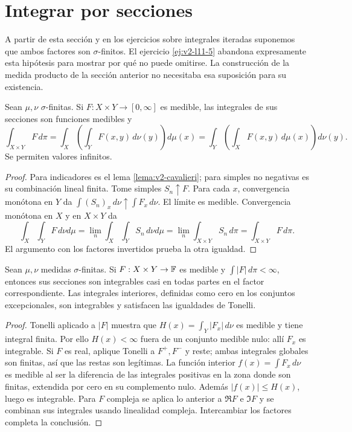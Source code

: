 \section{Integrar por secciones}
A partir de esta sección y en los ejercicios sobre integrales iteradas suponemos que ambos factores son $\sigma$-finitos. El ejercicio \ref{ej:v2-l11-5} abandona expresamente esta hipótesis para mostrar por qué no puede omitirse. La construcción de la medida producto de la sección anterior no necesitaba esa suposición para su existencia.
\begin{teorema}[Tonelli]\label{teo:v2-tonelli}
Sean $\mu,\nu$ $\sigma$-finitas. Si $F:X\times Y\to[0,\infty]$ es medible, las integrales de sus secciones son funciones medibles y
\[\int_{X\times Y}F\,d\pi=\int_X\left(\int_YF(x,y)\,d\nu(y)\right)d\mu(x)
=\int_Y\left(\int_XF(x,y)\,d\mu(x)\right)d\nu(y).\]
Se permiten valores infinitos.
\end{teorema}
\begin{proof}
Para indicadores es el lema \ref{lema:v2-cavalieri}; para simples no negativas es su combinación lineal finita. Tome simples $S_n\uparrow F$. Para cada $x$, convergencia monótona en $Y$ da $\int(S_n)_x\,d\nu\uparrow\int F_x\,d\nu$. El límite es medible. Convergencia monótona en $X$ y en $X\times Y$ da
\[\int_X\int_YF\,d\nu d\mu=\lim_n\int_X\int_YS_n\,d\nu d\mu
=\lim_n\int_{X\times Y}S_n\,d\pi=\int_{X\times Y}F\,d\pi.\]
El argumento con los factores invertidos prueba la otra igualdad.
\end{proof}
\begin{teorema}\label{teo:v2-fubini}
Sean $\mu,\nu$ medidas $\sigma$-finitas. Si $F:X\times Y\to\mathbb F$ es medible y $\int|F|\,d\pi<\infty$, entonces sus secciones son integrables casi en todas partes en el factor correspondiente. Las integrales interiores, definidas como cero en los conjuntos excepcionales, son integrables y satisfacen las igualdades de Tonelli.
\end{teorema}
\begin{proof}
Tonelli aplicado a $|F|$ muestra que $H(x)=\int_Y|F_x|\,d\nu$ es medible y tiene integral finita. Por ello $H(x)<\infty$ fuera de un conjunto medible nulo: allí $F_x$ es integrable. Si $F$ es real, aplique Tonelli a $F^+,F^-$ y reste; ambas integrales globales son finitas, así que las restas son legítimas. La función interior $f(x)=\int F_x\,d\nu$ es medible al ser la diferencia de las integrales positivas en la zona donde son finitas, extendida por cero en su complemento nulo. Además $|f(x)|\le H(x)$, luego es integrable. Para $F$ compleja se aplica lo anterior a $\Re F$ e $\Im F$ y se combinan sus integrales usando linealidad compleja. Intercambiar los factores completa la conclusión.
\end{proof}
